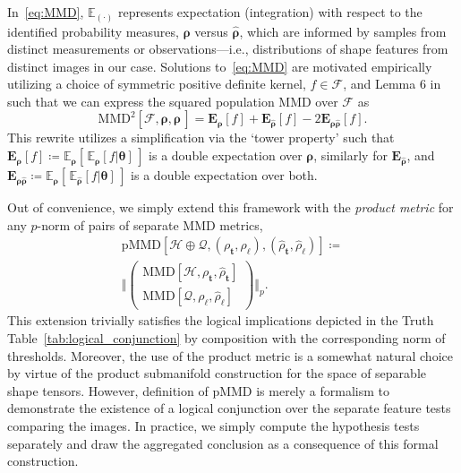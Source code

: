 \documentclass[pdflatex,iicol]{sn-jnl}%
\theoremstyle{thmstyleone}%
\theoremstyle{thmstyletwo}%
\theoremstyle{thmstylethree}%
\begin{document}
In~\eqref{eq:MMD}, $\mathbb{E}_{(\cdot)}$ represents expectation (integration) with respect to the identified probability measures, $\boldsymbol{\rho}$ versus $\widehat{\boldsymbol{\rho}}$, which are informed by samples from distinct measurements or observations---i.e., distributions of shape features from distinct images in our case. Solutions to~\eqref{eq:MMD} are motivated empirically utilizing a choice of symmetric positive definite kernel, $f \in \mathcal{F}$, and Lemma 6 in~\cite{gretton2012kernel} such that we can express the squared population MMD over $\mathcal{F}$ as
\begin{equation}
    \text{MMD}^2[\mathcal{F},\boldsymbol{\rho},\widehat{\boldsymbol{\rho}}\,] = \boldsymbol{E}_{\boldsymbol{\rho}}[f] + \boldsymbol{E}_{\widehat{\boldsymbol{\rho}}}[f] - 2\boldsymbol{E}_{\boldsymbol{\rho}\widehat{\boldsymbol{\rho}}}[f].
\end{equation}
This rewrite utilizes a simplification via the `tower property' such that $\boldsymbol{E}_{\boldsymbol{\rho}}[f] \coloneqq \mathbb{E}_{\boldsymbol{\rho}}[\,\mathbb{E}_{\boldsymbol{\rho}}[f\vert \boldsymbol{\theta}]\,]$ is a double expectation over $\boldsymbol{\rho}$, similarly for $\boldsymbol{E}_{\widehat{\boldsymbol{\rho}}}$, and $\boldsymbol{E}_{\boldsymbol{\rho}\widehat{\boldsymbol{\rho}}} \coloneqq \mathbb{E}_{\boldsymbol{\rho}}[\,\mathbb{E}_{\widehat{\boldsymbol{\rho}}}[f\vert \boldsymbol{\theta}]\,]$ is a double expectation over both.

Out of convenience, we simply extend this framework with the \textit{product metric} for any $p$-norm of pairs of separate MMD metrics,
\begin{multline} \label{eq:pMMD}
    \text{pMMD}[\mathcal{H} \oplus \mathcal{Q},(\rho_{\boldsymbol{t}},\rho_{\boldsymbol{\ell}}),(\widehat{\rho}_{\boldsymbol{t}},\widehat{\rho}_{\boldsymbol{\ell}})] \coloneqq \\
    \biggl\Vert \left(\begin{matrix}
    \text{MMD}[\mathcal{H},\rho_{\boldsymbol{t}},\widehat{\rho}_{\boldsymbol{t}}]\\
    \text{MMD}[\mathcal{Q},\rho_{\boldsymbol{\ell}},\widehat{\rho}_{\boldsymbol{\ell}}]
    \end{matrix}\right)\biggl\Vert_p.
\end{multline}
This extension trivially satisfies the logical implications depicted in the Truth Table~\ref{tab:logical_conjunction} by composition with the corresponding norm of thresholds. Moreover, the use of the product metric is a somewhat natural choice by virtue of the product submanifold construction for the space of separable shape tensors. However, definition of $\text{pMMD}$ is merely a formalism to demonstrate the existence of a logical conjunction over the separate feature tests comparing the images. In practice, we simply compute the hypothesis tests separately and draw the aggregated conclusion as a consequence of this formal construction.
\end{document}
